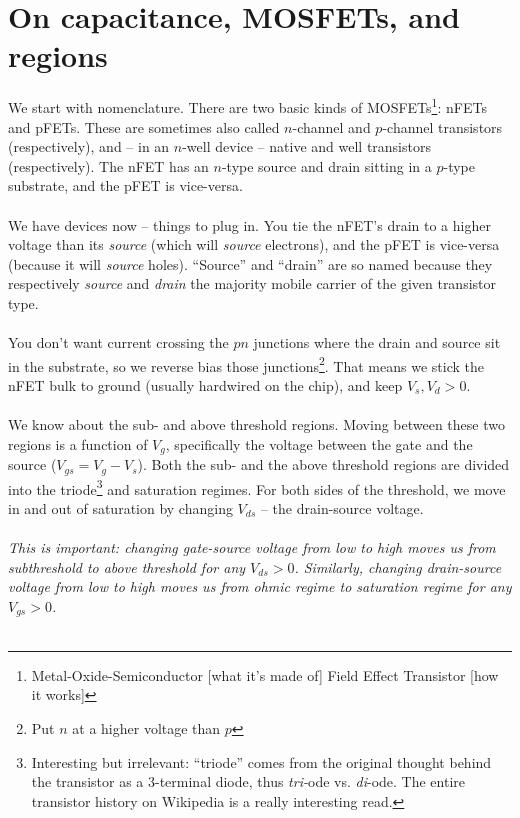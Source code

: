 \documentclass[main]{subfiles}
\begin{document}

\section{On capacitance, MOSFETs, and regions}
We start with nomenclature. There are two basic kinds of MOSFETs\footnote{Metal-Oxide-Semiconductor [what it's made of] Field Effect Transistor [how it works]}: nFETs and pFETs. These are sometimes also called $n$-channel and $p$-channel transistors (respectively), and – in an $n$-well device – native and well transistors (respectively). The nFET has an $n$-type source and drain sitting in a $p$-type substrate, and the pFET is vice-versa.\\ \\
We have devices now – things to plug in. You tie the nFET's drain to a higher voltage than its \textsl{source} (which will \textsl{source} electrons), and the pFET is vice-versa (because it will \textsl{source} holes). ``Source'' and ``drain'' are so named because they respectively \textsl{source} and \textsl{drain} the majority mobile carrier of the given transistor type.\\ \\
You don't want current crossing the $pn$ junctions where the drain and source sit in the substrate, so we reverse bias those junctions\footnote{Put $n$ at a higher voltage than $p$}. That means we stick the nFET bulk to ground (usually hardwired on the chip), and keep $V_s, V_d > 0$. \\ \\
We know about the sub- and above threshold regions. Moving between these two regions is a function of $V_g$, specifically the voltage between the gate and the source ($V_{gs} = V_g - V_s$). Both the sub- and the above threshold regions are divided into the triode\footnote{Interesting but irrelevant: ``triode'' comes from the original thought behind the transistor as a 3-terminal diode, thus \emph{tri-}ode vs. \emph{di}-ode. The entire transistor history on Wikipedia is a really interesting read.} and saturation regimes. For both sides of the threshold, we move in and out of saturation by changing $V_{ds}$ – the drain-source voltage.\\ \\
\textsl{This is important: changing \emph{gate-source} voltage from low to high moves us from subthreshold to above threshold for \emph{any} $V_{ds} > 0$. Similarly, changing \emph{drain-source} voltage from low to high moves us from ohmic regime to saturation regime for \emph{any} $V_{gs} > 0$.} \\ \\
\end{document}
